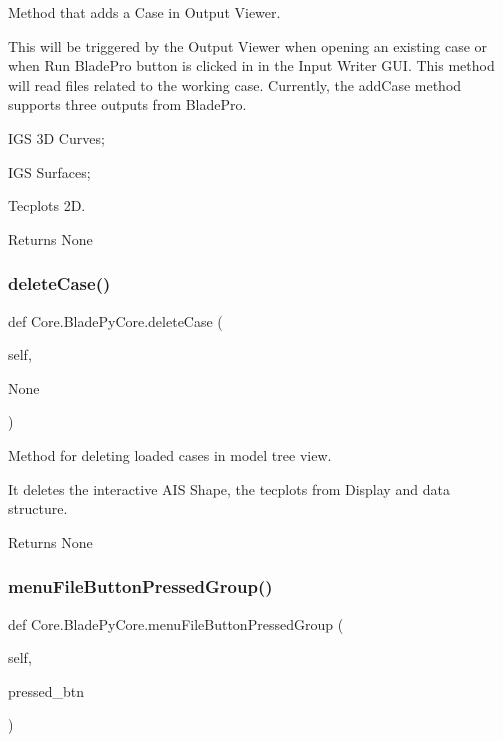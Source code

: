 Method that adds a Case in Output Viewer. 

This will be triggered by the Output Viewer when opening an existing case or when Run Blade\+Pro button is clicked in in the Input Writer G\+UI. This method will read files related to the working case. Currently, the add\+Case method supports three outputs from Blade\+Pro.

\begin{DoxyItemize}
\item I\+GS 3D Curves; \item I\+GS Surfaces; \item Tecplots 2D.\end{DoxyItemize}
\begin{DoxyReturn}{Returns}
None 
\end{DoxyReturn}
\hypertarget{a00081_a305ea5ff4997029c7a54a4550a23eba8}{}\label{a00081_a305ea5ff4997029c7a54a4550a23eba8} 
\subsubsection{\texorpdfstring{delete\+Case()}{deleteCase()}}
{\footnotesize\ttfamily def Core.\+Blade\+Py\+Core.\+delete\+Case (\begin{DoxyParamCaption}\item[{}]{self,  }\item[{}]{None }\end{DoxyParamCaption})}



Method for deleting loaded cases in model tree view. 

It deletes the interactive A\+IS Shape, the tecplots from Display and data structure.

\begin{DoxyReturn}{Returns}
None 
\end{DoxyReturn}
\hypertarget{a00081_aedcbcf23c32b9661d48f28e11c0c7172}{}\label{a00081_aedcbcf23c32b9661d48f28e11c0c7172} 
\subsubsection{\texorpdfstring{menu\+File\+Button\+Pressed\+Group()}{menuFileButtonPressedGroup()}}
{\footnotesize\ttfamily def Core.\+Blade\+Py\+Core.\+menu\+File\+Button\+Pressed\+Group (\begin{DoxyParamCaption}\item[{}]{self,  }\item[{}]{pressed\+\_\+btn }\end{DoxyParamCaption})}



